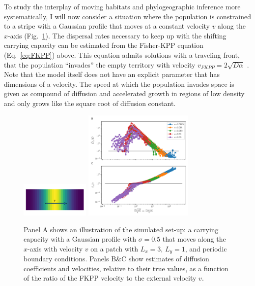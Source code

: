 \documentclass[aps,rmp, twocolumn]{revtex4}
\begin{document}
To study the interplay of moving habitats and phylogeographic inference more systematically, I will now consider a situation where the population is constrained to a stripe with a Gaussian profile that moves at a constant velocity $v$ along the $x$-axis (Fig.~\ref{fig:traveling_wave}).
The dispersal rates necessary to keep up with the shifting carrying capacity can be estimated from the Fisher-KPP equation (Eq.~\ref{eq:FKPP}) above.
This equation admits solutions with a traveling front, that the population ``invades'' the empty territory with velocity $v_{FKPP} = 2\sqrt{D \alpha}$ \citep{fisher_wave_1937,KPP1937,hallatschek_life_2010}.
Note that the model itself does not have an explicit parameter that has dimensions of a velocity.
The speed at which the population invades space is given as compound of diffusion and accelerated growth in regions of low density and only grows like the square root of diffusion constant.


\begin{figure}
    \includegraphics[width=0.3\textwidth]{figures/traveling_wave}
    \includegraphics[width=0.48\textwidth]{figures/waves}
    \caption{\label{fig:traveling_wave} Panel A shows an illustration of the simulated set-up: a carrying capacity with a Gaussian profile with $\sigma=0.5$ that moves along the $x$-axis with velocity $v$ on a patch with $L_x=3$, $L_y=1$, and periodic boundary conditions.
    Panels B\&C show estimates of diffusion coefficients and velocities, relative to their true values, as a function of the ratio of the FKPP velocity to the external velocity $v$. }
\end{figure}
\end{document}
